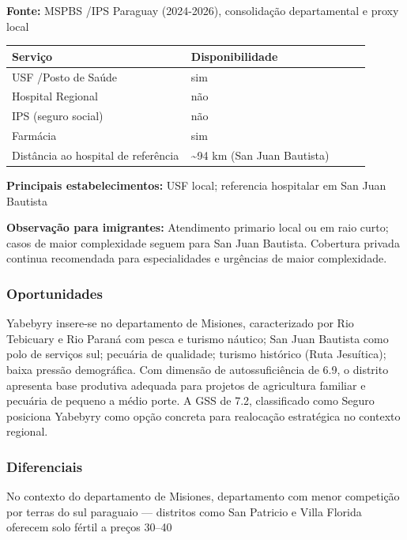 \textbf{Fonte:} MSPBS /\allowbreak  IPS Paraguay (2024-2026), consolidação
departamental e proxy local

{\def\LTcaptype{none} %
\begin{longtable}{@{}>{\raggedright\arraybackslash}p{0.45\linewidth} >{\raggedright\arraybackslash}p{0.45\linewidth}@{}}
\toprule\noalign{}
Serviço & Disponibilidade \\
\midrule\noalign{}
\endhead
\bottomrule\noalign{}
\endlastfoot
USF /\allowbreak  Posto de Saúde & sim \\
Hospital Regional & não \\
IPS (seguro social) & não \\
Farmácia & sim \\
Distância ao hospital de referência & \textasciitilde94 km (San Juan
Bautista) \\
\end{longtable}
}

\textbf{Principais estabelecimentos:} USF local; referencia hospitalar
em San Juan Bautista

\textbf{Observação para imigrantes:} Atendimento primario local ou em
raio curto; casos de maior complexidade seguem para San Juan Bautista.
Cobertura privada continua recomendada para especialidades e urgências
de maior complexidade.

\subsubsection*{Oportunidades}\label{oport-yabebyry-0810}
Yabebyry insere-se no departamento de Misiones, caracterizado por Rio Tebicuary e Rio Paraná com pesca e turismo náutico; San Juan Bautista como polo de serviços sul; pecuária de qualidade; turismo histórico (Ruta Jesuítica); baixa pressão demográfica. Com dimensão de autossuficiência de 6.9, o distrito apresenta base produtiva adequada para projetos de agricultura familiar e pecuária de pequeno a médio porte. A GSS de 7.2, classificado como Seguro posiciona Yabebyry como opção concreta para realocação estratégica no contexto regional.

\subsubsection*{Diferenciais}\label{dif-yabebyry-0810}
No contexto do departamento de Misiones, departamento com menor competição por terras do sul paraguaio — distritos como San Patricio e Villa Florida oferecem solo fértil a preços 30–40%
